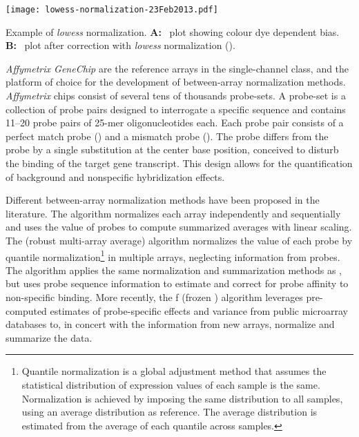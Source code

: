 \begin{marginfigure}[-4.2cm]%
  \begin{center}
    \texttt{[image: lowess-normalization-23Feb2013.pdf]}
    \caption[\emph{Lowess} normalization]{Example of \emph{lowess}
      normalization.  \textbf{A:}~ plot showing colour dye
      dependent bias.  \textbf{B:}~ plot after correction with
      \emph{lowess} normalization
      (\citealp{yang_normalization_2002}).}\label{fig:ma-plot}%
  \end{center}
\end{marginfigure}

\emph{Affymetrix GeneChip} are the reference arrays in the single-channel class,
and the platform of choice for the development of between-array normalization
methods.  \emph{Affymetrix} chips consist of several tens of thousands
probe-sets.  A probe-set is a collection of probe pairs designed to interrogate
a specific sequence and contains \numrange{11}{20} probe pairs of 25-mer
oligonucleotides each.  Each probe pair consists of a perfect match probe
() and a mismatch probe ().  The 
probe differs from the  probe by a single substitution at the
center base position, conceived to disturb the binding of the target gene
transcript.  This design allows for the quantification of background and
nonspecific hybridization effects.

Different between-array normalization methods have been proposed in the
literature.  The  algorithm\cite{hubbell_robust_2002} normalizes
each array independently and sequentially and uses the value of 
probes to compute summarized averages with linear scaling.  The 
(robust multi-array average) algorithm\cite{irizarry_exploration_2003}
normalizes the value of each probe by quantile normalization\footnote{Quantile
  normalization is a global adjustment method that assumes the statistical
  distribution of expression values of each sample is the same.  Normalization
  is achieved by imposing the same distribution to all samples, using an average
  distribution as reference.  The average distribution is estimated from the
  average of each quantile across samples.} in multiple arrays, neglecting
information from  probes.  The 
algorithm\cite{wu_model-based_2004} applies the same normalization and
summarization methods as , but uses probe sequence information to
estimate and correct for probe affinity to non-specific binding.  More recently,
the f (frozen ) algorithm\cite{mccall_frozen_2010}
leverages pre-computed estimates of probe-specific effects and variance from
public microarray databases to, in concert with the information from new arrays,
normalize and summarize the data.

